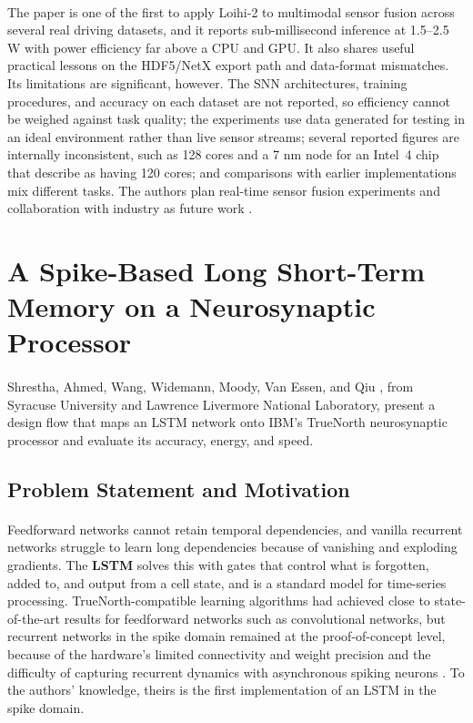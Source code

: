 \documentclass[12pt,a4paper,final]{extreport}
\begin{document}
\paragraph{} The paper is one of the first to apply Loihi-2 to multimodal sensor fusion across several real driving datasets, and it reports sub-millisecond inference at 1.5--2.5 W with power efficiency far above a CPU and GPU. It also shares useful practical lessons on the HDF5/NetX export path and data-format mismatches. Its limitations are significant, however. The SNN architectures, training procedures, and accuracy on each dataset are not reported, so efficiency cannot be weighed against task quality; the experiments use data generated for testing in an ideal environment rather than live sensor streams; several reported figures are internally inconsistent, such as 128 cores and a 7 nm node for an Intel~4 chip that \cite{p1,p4} describe as having 120 cores; and comparisons with earlier implementations mix different tasks. The authors plan real-time sensor fusion experiments and collaboration with industry as future work \cite{p2}.

\section{A Spike-Based Long Short-Term Memory on a Neurosynaptic Processor}

\paragraph{} Shrestha, Ahmed, Wang, Widemann, Moody, Van Essen, and Qiu \cite{p3}, from Syracuse University and Lawrence Livermore National Laboratory, present a design flow that maps an LSTM network onto IBM's TrueNorth neurosynaptic processor and evaluate its accuracy, energy, and speed.

\subsection{Problem Statement and Motivation}

\paragraph{} Feedforward networks cannot retain temporal dependencies, and vanilla recurrent networks struggle to learn long dependencies because of vanishing and exploding gradients. The \textbf{LSTM} solves this with gates that control what is forgotten, added to, and output from a cell state, and is a standard model for time-series processing. TrueNorth-compatible learning algorithms had achieved close to state-of-the-art results for feedforward networks such as convolutional networks, but recurrent networks in the spike domain remained at the proof-of-concept level, because of the hardware's limited connectivity and weight precision and the difficulty of capturing recurrent dynamics with asynchronous spiking neurons \cite{p3}. To the authors' knowledge, theirs is the first implementation of an LSTM in the spike domain.
\end{document}
